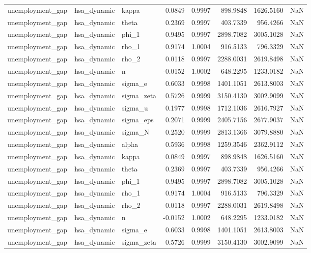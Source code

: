 \begin{tabular}{lllrrrrl}
unemployment\_gap & hsa\_dynamic & kappa & 0.0849 & 0.9997 & 898.9848 & 1626.5160 & NaN \\
unemployment\_gap & hsa\_dynamic & theta & 0.2369 & 0.9997 & 403.7339 & 956.4266 & NaN \\
unemployment\_gap & hsa\_dynamic & phi\_1 & 0.9495 & 0.9997 & 2898.7082 & 3005.1028 & NaN \\
unemployment\_gap & hsa\_dynamic & rho\_1 & 0.9174 & 1.0004 & 916.5133 & 796.3329 & NaN \\
unemployment\_gap & hsa\_dynamic & rho\_2 & 0.0118 & 0.9997 & 2288.0031 & 2619.8498 & NaN \\
unemployment\_gap & hsa\_dynamic & n & -0.0152 & 1.0002 & 648.2295 & 1233.0182 & NaN \\
unemployment\_gap & hsa\_dynamic & sigma\_e & 0.6033 & 0.9998 & 1401.1051 & 2613.8003 & NaN \\
unemployment\_gap & hsa\_dynamic & sigma\_zeta & 0.5726 & 0.9999 & 3150.4130 & 3002.9099 & NaN \\
unemployment\_gap & hsa\_dynamic & sigma\_u & 0.1977 & 0.9998 & 1712.1036 & 2616.7927 & NaN \\
unemployment\_gap & hsa\_dynamic & sigma\_eps & 0.2071 & 0.9999 & 2405.7156 & 2677.9037 & NaN \\
unemployment\_gap & hsa\_dynamic & sigma\_N & 0.2520 & 0.9999 & 2813.1366 & 3079.8880 & NaN \\
unemployment\_gap & hsa\_dynamic & alpha & 0.5936 & 0.9998 & 1259.3546 & 2362.9112 & NaN \\
unemployment\_gap & hsa\_dynamic & kappa & 0.0849 & 0.9997 & 898.9848 & 1626.5160 & NaN \\
unemployment\_gap & hsa\_dynamic & theta & 0.2369 & 0.9997 & 403.7339 & 956.4266 & NaN \\
unemployment\_gap & hsa\_dynamic & phi\_1 & 0.9495 & 0.9997 & 2898.7082 & 3005.1028 & NaN \\
unemployment\_gap & hsa\_dynamic & rho\_1 & 0.9174 & 1.0004 & 916.5133 & 796.3329 & NaN \\
unemployment\_gap & hsa\_dynamic & rho\_2 & 0.0118 & 0.9997 & 2288.0031 & 2619.8498 & NaN \\
unemployment\_gap & hsa\_dynamic & n & -0.0152 & 1.0002 & 648.2295 & 1233.0182 & NaN \\
unemployment\_gap & hsa\_dynamic & sigma\_e & 0.6033 & 0.9998 & 1401.1051 & 2613.8003 & NaN \\
unemployment\_gap & hsa\_dynamic & sigma\_zeta & 0.5726 & 0.9999 & 3150.4130 & 3002.9099 & NaN \\

\end{tabular}
